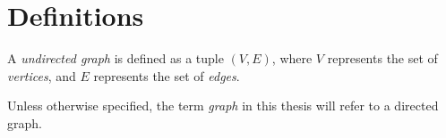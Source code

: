 \section{Definitions}

A \emph{undirected graph} is defined as a tuple $(V, E)$, where $V$ represents the set of \emph{vertices}, and $E$ represents the set of \emph{edges}.

Unless otherwise specified, the term \emph{graph} in this thesis will refer to a directed graph.